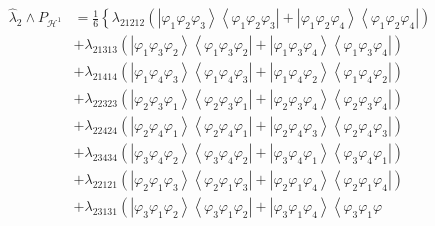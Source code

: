 \documentclass[12pt]{article}
\begin{document}
\begin{align*}
\hat{\lambda}_{2}\wedge P_{\mathcal{H}^{1}}& =\frac{1}{6}\left\{ \lambda
_{21212}\left( \left\vert \varphi _{1}\varphi _{2}\varphi _{3}\right\rangle
\left\langle \varphi _{1}\varphi _{2}\varphi _{3}\right\vert +\left\vert
\varphi _{1}\varphi _{2}\varphi _{4}\right\rangle \left\langle \varphi
_{1}\varphi _{2}\varphi _{4}\right\vert \right) \right. \\
& +\lambda _{21313}\left( \left\vert \varphi _{1}\varphi _{3}\varphi
_{2}\right\rangle \left\langle \varphi _{1}\varphi _{3}\varphi
_{2}\right\vert +\left\vert \varphi _{1}\varphi _{3}\varphi
_{4}\right\rangle \left\langle \varphi _{1}\varphi _{3}\varphi
_{4}\right\vert \right) \\
& +\lambda _{21414}\left( \left\vert \varphi _{1}\varphi _{4}\varphi
_{3}\right\rangle \left\langle \varphi _{1}\varphi _{4}\varphi
_{3}\right\vert +\left\vert \varphi _{1}\varphi _{4}\varphi
_{2}\right\rangle \left\langle \varphi _{1}\varphi _{4}\varphi
_{2}\right\vert \right) \\
& +\lambda _{22323}\left( \left\vert \varphi _{2}\varphi _{3}\varphi
_{1}\right\rangle \left\langle \varphi _{2}\varphi _{3}\varphi
_{1}\right\vert +\left\vert \varphi _{2}\varphi _{3}\varphi
_{4}\right\rangle \left\langle \varphi _{2}\varphi _{3}\varphi
_{4}\right\vert \right) \\
& +\lambda _{22424}\left( \left\vert \varphi _{2}\varphi _{4}\varphi
_{1}\right\rangle \left\langle \varphi _{2}\varphi _{4}\varphi
_{1}\right\vert +\left\vert \varphi _{2}\varphi _{4}\varphi
_{3}\right\rangle \left\langle \varphi _{2}\varphi _{4}\varphi
_{3}\right\vert \right) \\
& +\lambda _{23434}\left( \left\vert \varphi _{3}\varphi _{4}\varphi
_{2}\right\rangle \left\langle \varphi _{3}\varphi _{4}\varphi
_{2}\right\vert +\left\vert \varphi _{3}\varphi _{4}\varphi
_{1}\right\rangle \left\langle \varphi _{3}\varphi _{4}\varphi
_{1}\right\vert \right) \\
& +\lambda _{22121}\left( \left\vert \varphi _{2}\varphi _{1}\varphi
_{3}\right\rangle \left\langle \varphi _{2}\varphi _{1}\varphi
_{3}\right\vert +\left\vert \varphi _{2}\varphi _{1}\varphi
_{4}\right\rangle \left\langle \varphi _{2}\varphi _{1}\varphi
_{4}\right\vert \right) \\
& +\lambda _{23131}\left( \left\vert \varphi _{3}\varphi _{1}\varphi
_{2}\right\rangle \left\langle \varphi _{3}\varphi _{1}\varphi
_{2}\right\vert +\left\vert \varphi _{3}\varphi _{1}\varphi
_{4}\right\rangle \left\langle \varphi _{3}\varphi _{1}\varphi

\end{align*}
\end{document}
